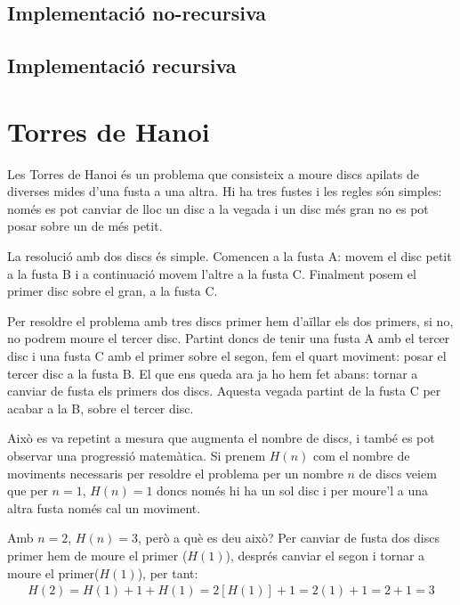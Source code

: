 \subsection{Implementació no-recursiva}


\subsection{Implementació recursiva}


\section{Torres de Hanoi}
Les Torres de Hanoi és un problema que consisteix a moure discs apilats de diverses mides d'una fusta a una altra.
Hi ha tres fustes i les regles són simples: només es pot canviar de lloc un disc a la vegada i un disc més gran no es pot posar sobre un de més petit.

La resolució amb dos discs és simple. Comencen a la fusta A: movem el disc petit a la fusta B i a continuació movem l'altre a la fusta C. Finalment posem el primer disc sobre el gran, a la fusta C.

\begin{center}
	
\end{center}

Per resoldre el problema amb tres discs primer hem d'aïllar els dos primers, si no, no podrem moure el tercer disc.
Partint doncs de tenir una fusta A amb el tercer disc i una fusta C amb el primer sobre el segon, fem el quart moviment: posar el tercer disc a la fusta B.
El que ens queda ara ja ho hem fet abans: tornar a canviar de fusta els primers dos discs. Aquesta vegada partint de la fusta C per acabar a la B, sobre el tercer disc.

Això es va repetint a mesura que augmenta el nombre de discs, i també es pot observar una progressió matemàtica.
Si prenem $H(n)$ com el nombre de moviments necessaris per resoldre el problema per un nombre $n$ de discs veiem que per $n=1$, $H(n)=1$ doncs només hi ha un sol disc i per moure'l a una altra fusta només cal un moviment.

Amb $n=2$, $H(n)=3$, però a què es deu això? Per canviar de fusta dos discs primer hem de moure el primer ($H{(1)}$), després canviar el segon i tornar a moure el primer($H(1)$), per tant:
\begin{gather*}
	H(2) = H(1)+1+H(1) = 2[H(1)]+1 = 2(1)+1 = 2+1 = 3
\end{gather*}

